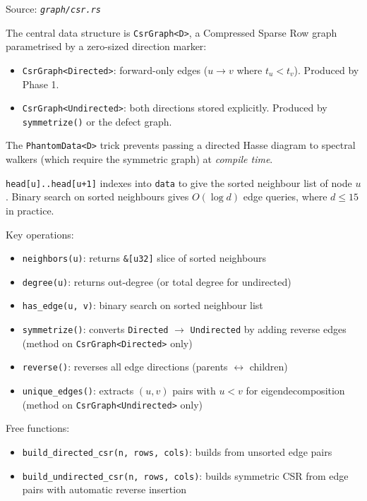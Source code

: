 \documentclass[11pt, a4paper, openany]{book}
\newcommand{\code}[1]{\texttt{#1}}
\newcommand{\func}[1]{\texttt{\color{structure}#1}}
\newcommand{\file}[1]{\texttt{\itshape #1}}
\begin{document}
Source: \file{graph/csr.rs}

The central data structure is \code{CsrGraph<D>}, a Compressed Sparse Row graph
parametrised by a zero-sized direction marker:

\begin{itemize}
  \item \code{CsrGraph<Directed>}: forward-only edges ($u \to v$ where
        $t_u < t_v$).  Produced by Phase 1.
  \item \code{CsrGraph<Undirected>}: both directions stored explicitly.
        Produced by \func{symmetrize()} or the defect graph.
\end{itemize}

The \code{PhantomData<D>} trick prevents passing a directed Hasse diagram to
spectral walkers (which require the symmetric graph) at \emph{compile time}.

\begin{definition}
  \code{head[u]..head[u+1]} indexes into \code{data} to give the sorted
  neighbour list of node $u$.  Binary search on sorted neighbours gives
  $O(\log d)$ edge queries, where $d \leq 15$ in practice.
\end{definition}

Key operations:
\begin{itemize}
  \item \func{neighbors(u)}: returns \code{\&[u32]} slice of sorted neighbours
  \item \func{degree(u)}: returns out-degree (or total degree for undirected)
  \item \func{has\_edge(u, v)}: binary search on sorted neighbour list
  \item \func{symmetrize()}: converts \code{Directed} $\to$ \code{Undirected}
        by adding reverse edges (method on \code{CsrGraph<Directed>} only)
  \item \func{reverse()}: reverses all edge directions (parents $\leftrightarrow$ children)
  \item \func{unique\_edges()}: extracts $(u, v)$ pairs with $u < v$ for
        eigendecomposition (method on \code{CsrGraph<Undirected>} only)
\end{itemize}

Free functions:
\begin{itemize}
  \item \func{build\_directed\_csr(n, rows, cols)}: builds from unsorted edge pairs
  \item \func{build\_undirected\_csr(n, rows, cols)}: builds symmetric CSR from
        edge pairs with automatic reverse insertion
\end{itemize}
\end{document}
